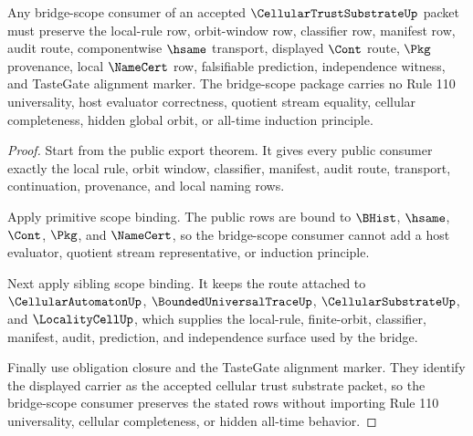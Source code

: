 \begin{theorem}
\label{thm:cellular-trust-substrate-bridge-scope-package}
Any bridge-scope consumer of an accepted $\CellularTrustSubstrateUp$ packet must preserve the local-rule row, orbit-window row, classifier row, manifest row, audit route, componentwise $\hsame$ transport, displayed $\Cont$ route, $\Pkg$ provenance, local $\NameCert$ row, falsifiable prediction, independence witness, and TasteGate alignment marker. The bridge-scope package carries no Rule 110 universality, host evaluator correctness, quotient stream equality, cellular completeness, hidden global orbit, or all-time induction principle.
\end{theorem}
\begin{proof}
Start from the public export theorem. It gives every public consumer exactly the local rule, orbit window, classifier, manifest, audit route, transport, continuation, provenance, and local naming rows.

Apply primitive scope binding. The public rows are bound to $\BHist$, $\hsame$, $\Cont$, $\Pkg$, and $\NameCert$, so the bridge-scope consumer cannot add a host evaluator, quotient stream representative, or induction principle.

Next apply sibling scope binding. It keeps the route attached to $\CellularAutomatonUp$, $\BoundedUniversalTraceUp$, $\CellularSubstrateUp$, and $\LocalityCellUp$, which supplies the local-rule, finite-orbit, classifier, manifest, audit, prediction, and independence surface used by the bridge.

Finally use obligation closure and the TasteGate alignment marker. They identify the displayed carrier as the accepted cellular trust substrate packet, so the bridge-scope consumer preserves the stated rows without importing Rule 110 universality, cellular completeness, or hidden all-time behavior.
\end{proof}

